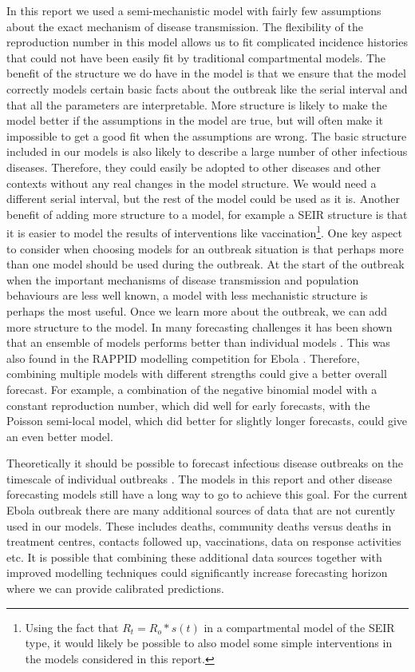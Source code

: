 \documentclass[12pt]{article}
\begin{document}
In this report we used a semi-mechanistic model with fairly few assumptions about the exact mechanism of disease transmission. The flexibility of the reproduction number in this model allows us to fit complicated incidence histories that could not have been easily fit by traditional compartmental models. The benefit of the structure we do have in the model is that we ensure that the model correctly models certain basic facts about the outbreak like the serial interval and that all the parameters are interpretable. More structure is likely to make the model better if the assumptions in the model are true, but will often make it impossible to get a good fit when the assumptions are wrong. The basic structure included in our models is also likely to describe a large number of other infectious diseases. Therefore, they could easily be adopted to other diseases and other contexts without any real changes in the model structure. We would need a different serial interval, but the rest of the model could be used as it is. Another benefit of adding more structure to a model, for example a SEIR structure is that it is easier to model the results of interventions like vaccination\footnote{Using the fact that $R_t=R_o*s(t)$ in a compartmental model of the SEIR type, it would likely be possible to also model some simple interventions in the models considered in this report.}. One key aspect to consider when choosing models for an outbreak situation is that perhaps more than one model should be used during the outbreak. At the start of the outbreak when the important mechanisms of disease transmission and population behaviours are less well known, a model with less mechanistic structure is perhaps the most useful. Once we learn more about the outbreak, we can add more structure to the model. In many forecasting challenges it has been shown that an ensemble of models performs better than individual models \cite{dietterichEnsembleMethodsMachine2000, yaoUsingStackingAverage2018}. This was also found in the RAPPID modelling competition for Ebola \cite{viboudRAPIDDEbolaForecasting2018}. Therefore, combining multiple models with different strengths could give a better overall forecast. For example, a combination of the negative binomial model with a constant reproduction number, which did well for early forecasts, with the Poisson semi-local model, which did better for slightly longer forecasts, could give an even better model.

Theoretically it should be possible to forecast infectious disease outbreaks on the timescale of individual outbreaks \cite{scarpinoPredictabilityInfectiousDisease2019}. The models in this report and other disease forecasting models still have a long way to go to achieve this goal. For the current Ebola outbreak there are many additional sources of data that are not curently used in our models. These includes deaths, community deaths versus deaths in treatment centres, contacts followed up, vaccinations, data on response activities etc. It is possible that combining these additional data sources together with improved modelling techniques could significantly increase forecasting horizon where we can provide calibrated predictions. 
\end{document}
